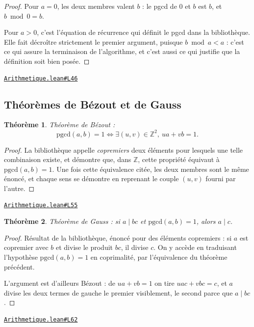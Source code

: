 \documentclass[11pt,a4paper]{article}
\theoremstyle{definition}
\theoremstyle{plain}
\newtheorem{theoreme}{Théorème}
\newcommand{\source}[2]{\par\smallskip\noindent\hfill{\footnotesize\href{#1}{\texttt{#2}}}\par\smallskip}
\begin{document}
\begin{proof}
Pour $a = 0$, les deux membres valent $b$ : le pgcd de $0$ et $b$ est $b$, et
$b \bmod 0 = b$.

Pour $a > 0$, c'est l'équation de récurrence qui définit le pgcd dans la bibliothèque. Elle
fait décroître strictement le premier argument, puisque $b \bmod a < a$ : c'est ce qui
assure la terminaison de l'algorithme, et c'est aussi ce qui justifie que la définition
soit bien posée.
\end{proof}
\source{https://github.com/Commutator-IO/learn-lean/blob/main/cours/02-lycee/10-specialite-mathematiques-terminale-s/Arithmetique.lean\#L46}{Arithmetique.lean\#L46}

\subsection{Théorèmes de Bézout et de Gauss}

\begin{theoreme}
Théorème de Bézout :
\[ \mathrm{pgcd}(a, b) = 1 \iff \exists (u, v) \in \mathbb{Z}^{2},\ ua + vb = 1 . \]
\end{theoreme}

\begin{proof}
La bibliothèque appelle \emph{copremiers} deux éléments pour lesquels une telle
combinaison existe, et démontre que, dans $\mathbb{Z}$, cette propriété équivaut à
$\mathrm{pgcd}(a, b) = 1$. Une fois cette équivalence citée, les deux membres sont le même
énoncé, et chaque sens se démontre en reprenant le couple $(u, v)$ fourni par l'autre.
\end{proof}
\source{https://github.com/Commutator-IO/learn-lean/blob/main/cours/02-lycee/10-specialite-mathematiques-terminale-s/Arithmetique.lean\#L55}{Arithmetique.lean\#L55}

\begin{theoreme}
Théorème de Gauss : si $a \mid bc$ et $\mathrm{pgcd}(a, b) = 1$, alors $a \mid c$.
\end{theoreme}

\begin{proof}
Résultat de la bibliothèque, énoncé pour des éléments copremiers : si $a$ est copremier
avec $b$ et divise le produit $bc$, il divise $c$. On y accède en traduisant l'hypothèse
$\mathrm{pgcd}(a, b) = 1$ en coprimalité, par l'équivalence du théorème précédent.

L'argument est d'ailleurs Bézout : de $ua + vb = 1$ on tire $uac + vbc = c$, et $a$ divise
les deux termes de gauche \textemdash{} le premier visiblement, le second parce que
$a \mid bc$.
\end{proof}
\source{https://github.com/Commutator-IO/learn-lean/blob/main/cours/02-lycee/10-specialite-mathematiques-terminale-s/Arithmetique.lean\#L62}{Arithmetique.lean\#L62}
\end{document}
